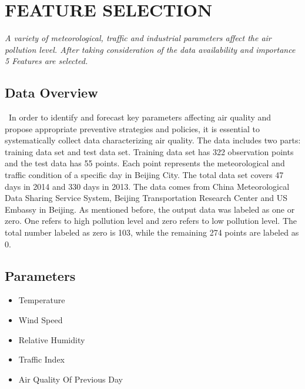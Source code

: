 

\chapter{FEATURE SELECTION}  %

{\em A variety of meteorological, traffic and industrial parameters affect the air pollution level. After
taking consideration of the data availability and importance 5 Features are selected.}
\section{Data Overview}\
In order to identify and forecast key parameters affecting air quality and propose appropriate preventive strategies and policies, it is essential to systematically collect data characterizing air quality. The data includes two parts: training data set and test data set. Training data set has 322 observation points and the test data has 55 points. Each point represents the meteorological and traffic condition of a specific day in Beijing City. The total data set covers 47 days in 2014 and 330 days in 2013. The data comes from China Meteorological Data Sharing Service System, Beijing Transportation Research Center and US Embassy in Beijing. As mentioned before, the output data was labeled as one or zero. One refers to high pollution level and zero refers to low pollution level. The total number labeled as zero is 103, while the remaining 274 points are labeled as 0.
\pagebreak
\section{Parameters}
\begin{itemize}
\item{Temperature}

	\item{Wind Speed}

	\item{Relative Humidity}
	
	\item{Traffic Index}
	
	\item{Air Quality Of Previous Day}
	
	
\end{itemize}

